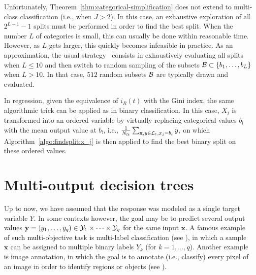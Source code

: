 Unfortunately, Theorem~\ref{thm:categorical-simplification} does not extend to
multi-class classification (i.e., when $J > 2$). In this case, an exhaustive
exploration of all $2^{L-1}-1$ splits must be performed in order
to find the best split.  When the number $L$ of categories is small, this can
usually be done  within reasonable time. However, as $L$ gets larger, this
quickly becomes infeasible in practice. As an approximation, the usual
strategy~\citep{liaw:2002} consists in exhaustively evaluating all splits when
$L \leq 10$ and then switch to random sampling of the subsets ${\cal B} \subset
\{ b_1, \dots, b_L \}$ when $L > 10$. In that case, $512$ random subsets ${\cal
B}$ are typically drawn and evaluated.

In regression, given the equivalence of $i_R(t)$ with the Gini index, the same
algorithmic trick can be applied as in binary classification. In this case,
$X_j$ is transformed into an ordered variable by virtually replacing
categorical values $b_l$ with the mean output value at $b_l$, i.e.,
$\tfrac{1}{N_{lt}} \sum_{\mathbf{x}, y \in {\cal L}_t, x_j = b_l} y$, on which
Algorithm~\ref{algo:findsplit:x_j} is then applied to find the best binary
split on these ordered values.


\section{Multi-output decision trees}

Up to now, we have assumed that the response was modeled as a single target
variable $Y$. In some contexts however, the goal may be to predict several
output values $\mathbf{y} = (y_1, \dots, y_q) \in {\cal Y}_1 \times \dots
\times {\cal Y}_q$ for the same input $\mathbf{x}$. A famous example of such
multi-objective task is multi-label classification (see
\citep{tsoumakas:2007}), in which a sample $\mathbf{x}$ can be assigned to
multiple binary labels $Y_k$ (for $k = 1, \dots, q$). Another example is image
annotation, in which the goal is to annotate (i.e., classify) every pixel of an
image  in order to identify regions or objects (see \citep{zhang:2012}).

